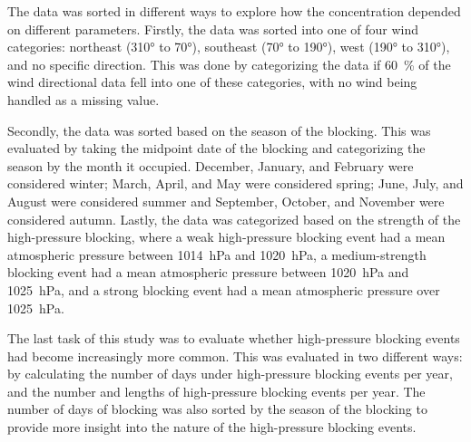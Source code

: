 The data was sorted in different ways to explore how the \PM concentration depended on different parameters. Firstly, the data was sorted into one of four wind categories: northeast (310° to 70°), southeast (70° to 190°), west (190° to 310°), and no specific direction. This was done by categorizing the data if \SI{60}{\%} of the wind directional data fell into one of these categories, with no wind being handled as a missing value.

Secondly, the data was sorted based on the season of the blocking. This was evaluated by taking the midpoint date of the blocking and categorizing the season by the month it occupied. December, January, and February were considered winter; March, April, and May were considered spring; June, July, and August were considered summer and September, October, and November were considered autumn. Lastly, the data was categorized based on the strength of the high-pressure blocking, where a weak high-pressure blocking event had a mean atmospheric pressure between \SI{1014}{\hecto\pascal} and \SI{1020}{\hecto\pascal}, a medium-strength blocking event had a mean atmospheric pressure between \SI{1020}{\hecto\pascal} and \SI{1025}{\hecto\pascal}, and a strong blocking event had a mean atmospheric pressure over \SI{1025}{\hecto\pascal}.

The last task of this study was to evaluate whether high-pressure blocking events had become increasingly more common. This was evaluated in two different ways: by calculating the number of days under high-pressure blocking events per year, and the number and lengths of high-pressure blocking events per year. The number of days of blocking was also sorted by the season of the blocking to provide more insight into the nature of the high-pressure blocking events. 

